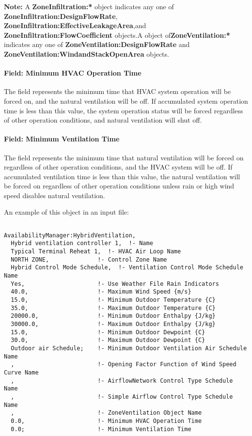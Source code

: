 \textbf{Note:} A \textbf{ZoneInfiltration:*} object indicates any one of \textbf{ZoneInfiltration:DesignFlowRate}, \textbf{ZoneInfiltration:EffectiveLeakageArea},and \textbf{ZoneInfiltration:FlowCoefficient} objects.A object of\textbf{ZoneVentilation:*} indicates any one of \textbf{ZoneVentilation:DesignFlowRate} and \textbf{ZoneVentilation:WindandStackOpenArea} objects.

\paragraph{Field: Minimum HVAC Operation Time}\label{field-minimum-hvac-operation-time}

 The field represents the minimum time that HVAC system operation will be forced on, and the natural ventilation will be off. If accumulated system operation time is less than this value, the system operation status will be forced regardless of other operation conditions, and natural ventilation will shut off. 

\paragraph{Field: Minimum Ventilation Time}\label{field-minimum-ventilation-time}

 The field represents the minimum time that natural ventilation will be forced on regardless of other operation conditions, and the HVAC system will be off. If accumulated ventilation time is less than this value, the natural ventilation will be forced on regardless of other operation conditions unless rain or high wind speed disables natural ventilation.


An example of this object in an input file:

\begin{lstlisting}

AvailabilityManager:HybridVentilation,
  Hybrid ventilation controller 1,  !- Name
  Typical Terminal Reheat 1,  !- HVAC Air Loop Name
  NORTH ZONE,              !- Control Zone Name
  Hybrid Control Mode Schedule,  !- Ventilation Control Mode Schedule Name
  Yes,                     !- Use Weather File Rain Indicators
  40.0,                    !- Maximum Wind Speed {m/s}
  15.0,                    !- Minimum Outdoor Temperature {C}
  35.0,                    !- Maximum Outdoor Temperature {C}
  20000.0,                 !- Minimum Outdoor Enthalpy {J/kg}
  30000.0,                 !- Maximum Outdoor Enthalpy {J/kg}
  15.0,                    !- Minimum Outdoor Dewpoint {C}
  30.0,                    !- Maximum Outdoor Dewpoint {C}
  Outdoor air Schedule;    !- Minimum Outdoor Ventilation Air Schedule Name
  ,                        !- Opening Factor Function of Wind Speed Curve Name
  ,                        !- AirflowNetwork Control Type Schedule Name
  ,                        !- Simple Airflow Control Type Schedule Name
  ,                        !- ZoneVentilation Object Name
  0.0,                     !- Minimum HVAC Operation Time
  0.0;                     !- Minimum Ventilation Time

\end{lstlisting}

